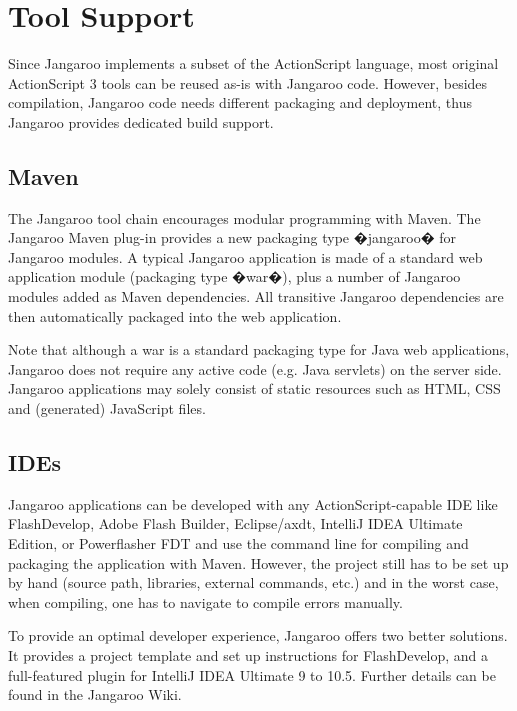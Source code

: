 \documentclass[11pt]{sigplanconf}
\begin{document}
\section{Tool Support}

Since Jangaroo implements a subset of the ActionScript language, most original ActionScript 3 tools can be reused as-is with Jangaroo code. However, besides compilation, Jangaroo code needs different packaging and deployment, thus Jangaroo provides dedicated build support.

\subsection{Maven}

The Jangaroo tool chain encourages modular programming with Maven\citep{maven}. The Jangaroo Maven plug-in provides a new packaging type �jangaroo� for Jangaroo modules. A typical Jangaroo application is made of a standard web application module (packaging type �war�), plus a number of Jangaroo modules added as Maven dependencies. All transitive Jangaroo dependencies are then automatically packaged into the web application. 

Note that although a war is a standard packaging type for Java web applications, Jangaroo does not require any active code (e.g. Java servlets) on the server side. Jangaroo applications may solely consist of static resources such as HTML, CSS and (generated) JavaScript files.

\subsection{IDEs}

Jangaroo applications can be developed with any
Ac\-tion\-Script-capable IDE like FlashDevelop\citep{FlashDevelop},
Adobe Flash Builder\citep{flabui}, Eclipse/axdt\citep{axdt},
IntelliJ IDEA Ultimate Edition\citep{idea}, or
Powerflasher FDT\citep{fdt}
and use the command line for compiling and packaging the application with Maven. However, the project still has to be set up by hand (source path, libraries, external commands, etc.) and in the worst case, when compiling, one has to navigate to compile errors manually.

To provide an optimal developer experience, Jangaroo offers two better solutions. It provides a project template and set up instructions for FlashDevelop, and a full-featured plugin for IntelliJ IDEA Ultimate 9 to 10.5.
Further details can be found in the Jangaroo Wiki\citep{jwiki}.
\end{document}
